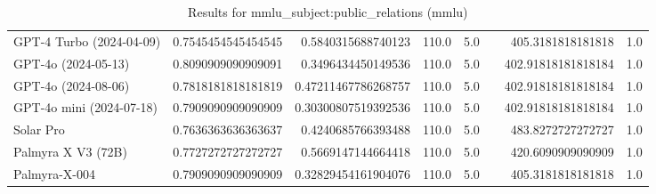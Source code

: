 \begin{table}[htp]
{\begin{tabular}{lrrrrrrr}
GPT-4 Turbo (2024-04-09) & 0.7545454545454545 & 0.5840315688740123 & 110.0 & 5.0 &  & 405.3181818181818 & 1.0 \\
GPT-4o (2024-05-13) & 0.8090909090909091 & 0.3496434450149536 & 110.0 & 5.0 &  & 402.91818181818184 & 1.0 \\
GPT-4o (2024-08-06) & 0.7818181818181819 & 0.47211467786268757 & 110.0 & 5.0 &  & 402.91818181818184 & 1.0 \\
GPT-4o mini (2024-07-18) & 0.7909090909090909 & 0.30300807519392536 & 110.0 & 5.0 &  & 402.91818181818184 & 1.0 \\
Solar Pro & 0.7636363636363637 & 0.4240685766393488 & 110.0 & 5.0 &  & 483.8272727272727 & 1.0 \\
Palmyra X V3 (72B) & 0.7727272727272727 & 0.5669147144664418 & 110.0 & 5.0 &  & 420.6090909090909 & 1.0 \\
Palmyra-X-004 & 0.7909090909090909 & 0.32829454161904076 & 110.0 & 5.0 &  & 405.3181818181818 & 1.0 \\
\bottomrule
\end{tabular}}
\caption{Results for mmlu_subject:public_relations (mmlu)}
\label{fig:mmlu_subject:public_relations (mmlu)}
\end{table}